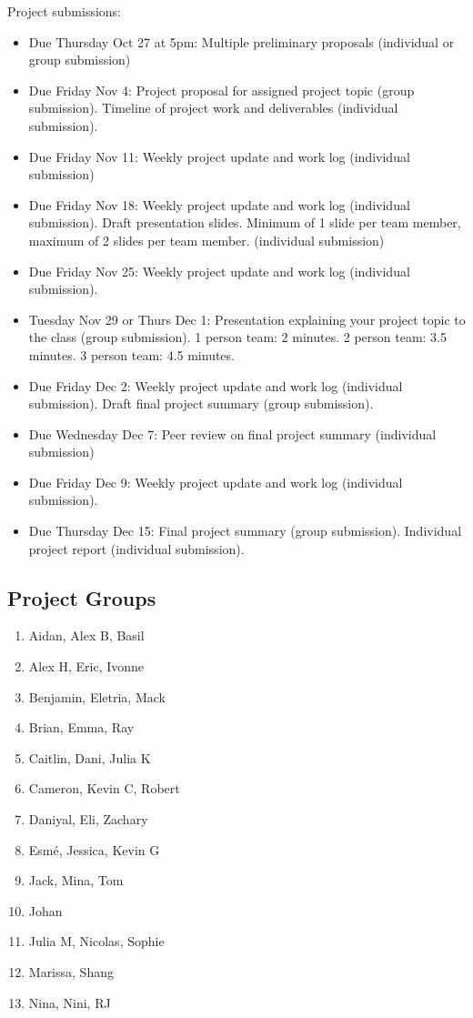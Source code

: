 \documentclass[12pt,letterpaper,noanswers]{exam}
\begin{document}
\noindent Project submissions:
\begin{itemize}
\item Due Thursday Oct 27 at 5pm: Multiple preliminary proposals (individual or group submission)
    \item Due Friday Nov 4: Project proposal for assigned project topic (group submission).  Timeline of project work and deliverables (individual submission).
    \item Due Friday Nov 11: Weekly project update and work log (individual submission)
    \item Due Friday Nov 18: Weekly project update and work log (individual submission).  Draft presentation slides.  Minimum of 1 slide per team member, maximum of 2 slides per team member.  (individual submission)
    \item Due Friday Nov 25: Weekly project update and work log (individual submission).  
    \item Tuesday Nov 29 or Thurs Dec 1: Presentation explaining your project topic to the class (group submission).  1 person team: 2 minutes.  2 person team: 3.5 minutes.  3 person team: 4.5 minutes.
    \item Due Friday Dec 2: Weekly project update and work log (individual submission).  Draft final project summary (group submission).
    \item Due Wednesday Dec 7: Peer review on final project summary (individual submission)
    \item Due Friday Dec 9: Weekly project update and work log (individual submission).
    \item Due Thursday Dec 15: Final project summary (group submission).  Individual project report (individual submission).
\end{itemize}

\eject
\subsection*{Project Groups}
\begin{multicols}{2}
\begin{enumerate}
\itemsep0pt
    \item Aidan, Alex B, Basil
    \item Alex H, Eric, Ivonne
    \item Benjamin, Eletria, Mack
    \item Brian, Emma, Ray
    \item Caitlin, Dani, Julia K
    \item Cameron, Kevin C, Robert
    \item Daniyal, Eli, Zachary
    \item Esmé, Jessica, Kevin G
    \item Jack, Mina, Tom
    \item Johan
    \item Julia M, Nicolas, Sophie
    \item Marissa, Shang
    \item Nina, Nini, RJ
\end{enumerate}
\end{multicols}
\end{document}
